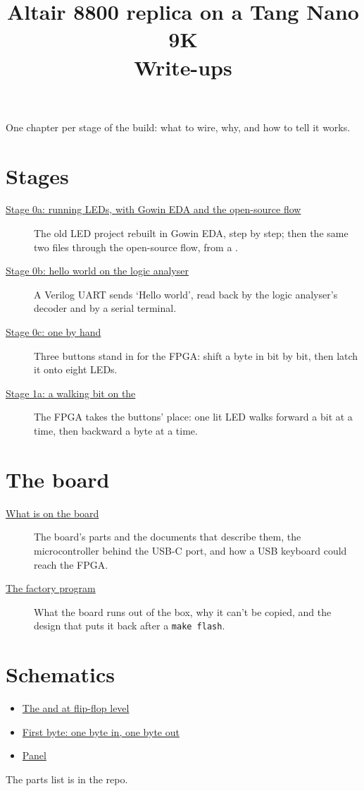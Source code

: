 \documentclass[11pt,a4paper]{article}
\title{Altair 8800 replica on a Tang Nano 9K\\[0.3em]\large Write-ups}
\author{}
\date{}
\begin{document}
\maketitle

One chapter per stage of the build: what to wire, why, and how to tell it works.

\section*{Stages}

\begin{description}
  \item[\href{running-leds.pdf}{Stage 0a: running LEDs, with Gowin EDA and the open-source flow}]
    The old LED project rebuilt in Gowin EDA, step by step; then the same two files through the open-source flow, from a .
  \item[\href{hello-analyser.pdf}{Stage 0b: hello world on the logic analyser}]
    A Verilog UART sends ‘Hello world’, read back by the logic analyser’s decoder and by a serial terminal.
  \item[\href{595-by-hand.pdf}{Stage 0c: one  by hand}]
    Three buttons stand in for the FPGA: shift a byte in bit by bit, then latch it onto eight LEDs.
  \item[\href{595-by-fpga.pdf}{Stage 1a: a walking bit on the }]
    The FPGA takes the buttons’ place: one lit LED walks forward a bit at a time, then backward a byte at a time.
\end{description}

\section*{The board}

\begin{description}
  \item[\href{the-board.pdf}{What is on the board}]
    The board’s parts and the documents that describe them, the  microcontroller behind the USB-C port, and how a USB keyboard could reach the FPGA.
  \item[\href{factory.pdf}{The factory program}]
    What the board runs out of the box, why it can’t be copied, and the design that puts it back after a \texttt{make flash}.
\end{description}

\section*{Schematics}

\begin{itemize}
  \item \href{74hc595-74hc165-internals.pdf}{The  and  at flip-flop level}
  \item \href{altair-first-byte-schematic.pdf}{First byte: one byte in, one byte out}
  \item \href{altair-panel-sr-schematic.pdf}{Panel}
\end{itemize}

The parts list is  in the repo.

\revisiontable
\end{document}
